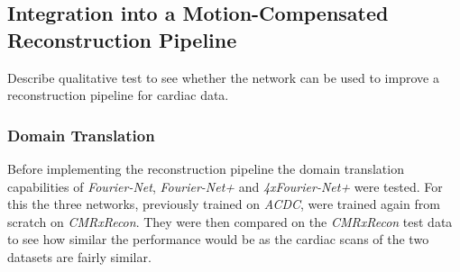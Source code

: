 \documentclass[english,version-2022-01]{uzl-thesis} %
\begin{document}
%

\subsection{Integration into a Motion-Compensated Reconstruction Pipeline} \label{SubSec:IntegrationMotion-CompensatedReconstructionPipeline}
Describe qualitative test to see whether the network can be used to improve a reconstruction pipeline for cardiac data.

\subsubsection{Domain Translation} \label{SubSubSec:DomainTranslation}
Before implementing the reconstruction pipeline the domain translation capabilities of \emph{Fourier-Net}, \emph{Fourier-Net+} and \emph{4xFourier-Net+} were tested. For this the three networks, previously trained on \emph{ACDC}, were trained again from scratch on \emph{CMRxRecon}. They were then compared on the \emph{CMRxRecon} test data to see how similar the performance would be as the cardiac scans of the two datasets are fairly similar.
\end{document}
